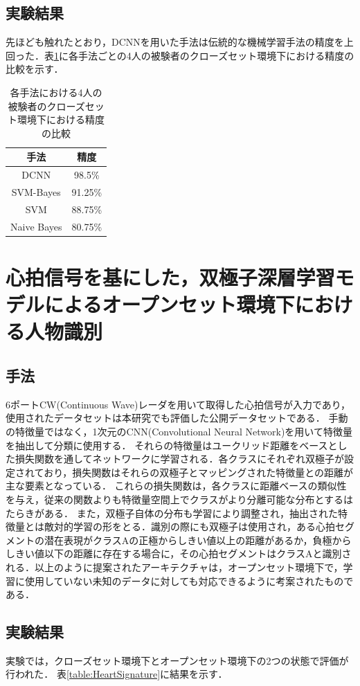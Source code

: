 \subsection{実験結果}
先ほども触れたとおり，DCNNを用いた手法は伝統的な機械学習手法の精度を上回った．表\ref{table:HeartID}に各手法ごとの4人の被験者のクローズセット環境下における精度の比較を示す．

\begin{table}[H]
\caption{各手法における4人の被験者のクローズセット環境下における精度の比較}
\centering
\begin{tabular}{cc}
\hline
手法 & 精度 \\
\hline
DCNN & 98.5\% \\
SVM-Bayes & 91.25\% \\
SVM & 88.75\% \\
Naive Bayes & 80.75\% \\
\hline
\end{tabular}
\label{table:HeartID}
\end{table}

\section{心拍信号を基にした，双極子深層学習モデルによるオープンセット環境下における人物識別\cite{paper:HeartSignature}}
\subsection{手法}
6ポートCW(Continuous Wave)レーダを用いて取得した心拍信号が入力であり，使用されたデータセットは本研究でも評価した公開データセットである．
手動の特徴量ではなく，1次元のCNN(Convolutional Neural Network)を用いて特徴量を抽出して分類に使用する．
それらの特徴量はユークリッド距離をベースとした損失関数を通してネットワークに学習される．各クラスにそれぞれ双極子が設定されており，損失関数はそれらの双極子とマッピングされた特徴量との距離が主な要素となっている．
これらの損失関数は，各クラスに距離ベースの類似性を与え，従来の関数よりも特徴量空間上でクラスがより分離可能な分布とするはたらきがある．
また，双極子自体の分布も学習により調整され，抽出された特徴量とは敵対的学習の形をとる．識別の際にも双極子は使用され，ある心拍セグメントの潜在表現がクラスAの正極からしきい値以上の距離があるか，負極からしきい値以下の距離に存在する場合に，その心拍セグメントはクラスAと識別される．以上のように提案されたアーキテクチャは，オープンセット環境下で，学習に使用していない未知のデータに対しても対応できるように考案されたものである．

\subsection{実験結果}
実験では，クローズセット環境下とオープンセット環境下の2つの状態で評価が行われた．
表\ref{table:HeartSignature}に結果を示す．

